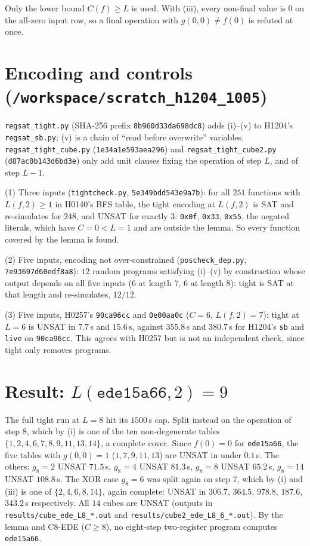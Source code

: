 \documentclass[11pt]{article}
\begin{document}
Only the lower bound $C(f)\ge L$ is used. With (iii), every non-final value is $0$ on the all-zero input row, so a final operation with $g(0,0)\ne f(0)$ is refuted at once.

\section*{Encoding and controls (\texttt{/workspace/scratch\_h1204\_1005})}
\texttt{regsat\_tight.py} (SHA-256 prefix \texttt{8b960d33da698dc8}) adds (i)--(v) to H1204's \texttt{regsat\_sb.py}; (v) is a chain of ``read before overwrite'' variables. \texttt{regsat\_tight\_cube.py} (\texttt{1e34a1e593aea296}) and \texttt{regsat\_tight\_cube2.py} (\texttt{d87ac0b143d6bd3e}) only add unit clauses fixing the operation of step $L$, and of step $L-1$.

(1) Three inputs (\texttt{tightcheck.py}, \texttt{5e349bdd543e9a7b}): for all $251$ functions with $L(f,2)\ge1$ in H0140's BFS table, the tight encoding at $L(f,2)$ is SAT and re-simulates for $248$, and UNSAT for exactly $3$: \texttt{0x0f}, \texttt{0x33}, \texttt{0x55}, the negated literals, which have $C=0<L=1$ and are outside the lemma. So every function covered by the lemma is found.

(2) Five inputs, encoding not over-constrained (\texttt{poscheck\_dep.py}, \texttt{7e93697d60edf8a8}): $12$ random programs satisfying (i)--(v) by construction whose output depends on all five inputs ($6$ at length $7$, $6$ at length $8$): tight is SAT at that length and re-simulates, $12/12$.

(3) Five inputs, H0257's \texttt{90ca96cc} and \texttt{0e00aa0c} ($C=6$, $L(f,2)=7$): tight at $L=6$ is UNSAT in $7.7$\,s and $15.6$\,s, against $355.8$\,s and $380.7$\,s for H1204's \texttt{sb} and \texttt{live} on \texttt{90ca96cc}. This agrees with H0257 but is not an independent check, since tight only removes programs.

\section*{Result: $L(\texttt{ede15a66},2)=9$}
The full tight run at $L=8$ hit its $1500$\,s cap. Split instead on the operation of step $8$, which by (i) is one of the ten non-degenerate tables $\{1,2,4,6,7,8,9,11,13,14\}$, a complete cover. Since $f(0)=0$ for \texttt{ede15a66}, the five tables with $g(0,0)=1$ ($1,7,9,11,13$) are UNSAT in under $0.1$\,s. The others: $g_8=2$ UNSAT $71.5$\,s, $g_8=4$ UNSAT $81.3$\,s, $g_8=8$ UNSAT $65.2$\,s, $g_8=14$ UNSAT $108.8$\,s. The XOR case $g_8=6$ was split again on step $7$, which by (i) and (iii) is one of $\{2,4,6,8,14\}$, again complete: UNSAT in $306.7$, $364.5$, $978.8$, $187.6$, $343.2$\,s respectively. All $14$ cubes are UNSAT (outputs in \texttt{results/cube\_ede\_L8\_*.out} and \texttt{results/cube2\_ede\_L8\_6\_*.out}). By the lemma and C8-EDE ($C\ge8$), no eight-step two-register program computes \texttt{ede15a66}.
\end{document}
